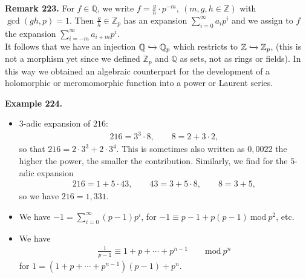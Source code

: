 \documentclass[12pt,a4paper,footinclude=true,headinclude=true]{scrbook} %
\newenvironment{remark}[2][Remark]
    { \begin{mdframed}[backgroundcolor=gray!20] \textbf{#1 #2.} }
    {  \end{mdframed}}
\newenvironment{example}[2][Example]
    { \begin{mdframed}[backgroundcolor=gray!20] \textbf{#1 #2.} }
    {  \end{mdframed}}
\begin{document}
\begin{remark}{223}
    For $f\in\mathbb{Q}$, we write $f=\frac{g}{h}\cdot p^{-m},\ (m,g,h\in\mathbb{Z})$ with $\gcd{(gh,p)}=1$. Then $\frac{g}{h}\in\mathbb{Z}_p$ has an expansion $\sum_{i=0}^\infty a_ip^i$ and we assign to $f$ the expansion $\sum_{i=-m}^\infty a_{i+m}p^i$.\\
    It follows that we have an injection $\mathbb{Q}\xhookrightarrow{} \mathbb{Q}_p$ which restricts to $\mathbb{Z}\xhookrightarrow{} \mathbb{Z}_p$, (this is not a morphism yet since we defined $\mathbb{Z}_p$ and $\mathbb{Q}$ as sets, not as rings or fields). In this way we obtained an algebraic counterpart for the development of a holomorphic or meromomorphic function into a power or Laurent series.
\end{remark}

\begin{example}{224}
    \begin{itemize}
        \item[(a)] $3$-adic expansion of $216$:
        \begin{align*}
            216=3^3\cdot8,\qquad 8=2+3\cdot2,
        \end{align*}
        so that $216=2\cdot3^3+2\cdot3^4$. This is sometimes also written as $0,0022$ \textemdash the higher the power, the smaller the contribution. Similarly, we find for the $5$-adic expansion
        \begin{align*}
            216=1+5\cdot43,\qquad 43=3+5\cdot8,\qquad 8=3+5,
        \end{align*}
        so we have $216=1,331$.
        \item[(b)] We have $-1=\sum_{i=0}^\infty(p-1)p^i$, for $-1\equiv p-1+p(p-1)\ \mathrm{mod}\ p^2$, etc.
        \item[(c)] We have
        \begin{align*}
            \tfrac{1}{p-1}\equiv1+p+\cdots+p^{n-1}\qquad \mathrm{mod}\ p^n
        \end{align*}
        for $1=(1+p+\cdots+p^{n-1})(p-1)+p^n$.
    \end{itemize}
\end{example}
\end{document}
